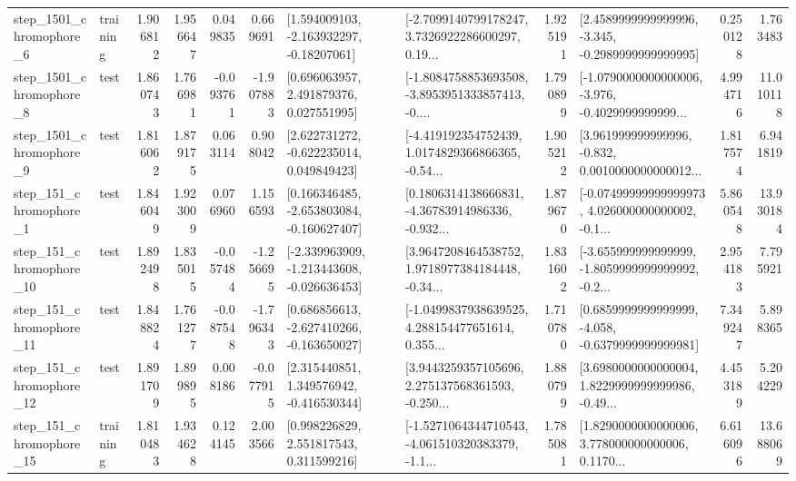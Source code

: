 \begin{tabular}{llrrrrllrlrr}
  step\_1501\_chromophore\_6 &  training &      1.906812 &    1.956647 &      0.049835 &  0.669691 &    [1.594009103, -2.163932297, -0.18207061] &  [-2.7099140799178247, 3.7326922286600297, 0.19... &       1.925191 &  [2.4589999999999996, -3.345, -0.2989999999999995] &            0.250128 &          1.763483 \\
  step\_1501\_chromophore\_8 &      test &      1.860743 &    1.766981 &     -0.093761 & -1.907883 &     [0.696063957, 2.491879376, 0.027551995] &  [-1.8084758853693508, -3.8953951333857413, -0.... &       1.790899 &  [-1.0790000000000006, -3.976, -0.4029999999999... &            4.994716 &         11.010118 \\
  step\_1501\_chromophore\_9 &      test &      1.816062 &    1.879175 &      0.063114 &  0.908042 &    [2.622731272, -0.622235014, 0.049849423] &  [-4.419192354752439, 1.0174829366866365, -0.54... &       1.905212 &  [3.961999999999996, -0.832, 0.0010000000000012... &            1.817574 &          6.941819 \\
   step\_151\_chromophore\_1 &      test &      1.846049 &    1.923009 &      0.076960 &  1.156593 &   [0.166346485, -2.653803084, -0.160627407] &  [0.1806314138666831, -4.36783914986336, -0.932... &       1.879670 &  [-0.07499999999999973, 4.026000000000002, -0.1... &            5.860548 &         13.930184 \\
  step\_151\_chromophore\_10 &      test &      1.892498 &    1.835015 &     -0.057484 & -1.256695 &  [-2.339963909, -1.213443608, -0.026636453] &  [3.9647208464538752, 1.9718977384184448, -0.34... &       1.831602 &  [-3.655999999999999, -1.8059999999999992, -0.2... &            2.954183 &          7.795921 \\
  step\_151\_chromophore\_11 &      test &      1.848824 &    1.761277 &     -0.087548 & -1.796343 &   [0.686856613, -2.627410266, -0.163650027] &  [-1.0499837938639525, 4.288154477651614, 0.355... &       1.710780 &  [0.6859999999999999, -4.058, -0.6379999999999981] &            7.349247 &          5.898365 \\
  step\_151\_chromophore\_12 &      test &      1.891709 &    1.899895 &      0.008186 & -0.077915 &    [2.315440851, 1.349576942, -0.416530344] &  [3.9443259357105696, 2.275137568361593, -0.250... &       1.880799 &  [3.6980000000000004, 1.8229999999999986, -0.49... &            4.453189 &          5.204229 \\
  step\_151\_chromophore\_15 &  training &      1.810483 &    1.934628 &      0.124145 &  2.003566 &     [0.998226829, 2.551817543, 0.311599216] &  [-1.5271064344710543, -4.061510320383379, -1.1... &       1.785081 &  [1.8290000000000006, 3.778000000000006, 0.1170... &            6.616096 &         13.688069 \\

\end{tabular}
